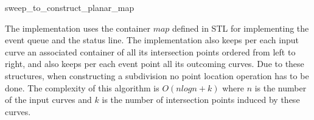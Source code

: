 \begin{ccRefFunction}{sweep_to_construct_planar_map}
\ccSeeAlso
{}

\ccImplementation 
The implementation uses the container $map$ defined in STL for implementing 
the event queue and the status line.
The implementation also keeps per each input curve an associated container of all 
its intersection points ordered from left to right, and also keeps per each event point all 
its outcoming curves.   
Due to these structures, when constructing a subdivision no point location operation has to be done. 
The complexity of this algorithm is $O(nlogn + k)$ where $n$ is the number of the input curves 
and $k$ is the number of intersection points induced by these curves.

\end{ccRefFunction} %

\ccRefPageEnd











